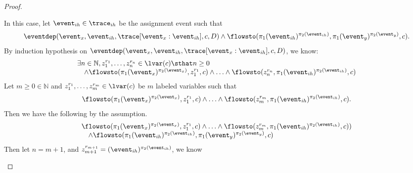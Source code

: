 \begin{proof}
\begin{case}
        In this case, let $\event_{ih}\in \trace_{ih} $ be the assignment event such that
        \[
        \eventdep(\event_x, \event_{ih}, \trace[\event_x:\event_{ih}], c, D)
          \land 
        \flowsto(\pi_1(\event_{ih})^{\pi_2(\event_{ih})}, \pi_1(\event_y)^{\pi_2(\event_y)}, c).
        \]
        By induction hypothesis on $\eventdep(\event_x, \event_{ih}, \trace[\event_x : \event_{ih}], c, D)$, we know:
        \[
          \begin{array}{l}
            \exists n \in \mathbb{N}, z_1^{r_1}, \ldots, z_n^{r_n} \in \lvar(c) 
            \sthat  n \geq 0 
            \\ \quad  \land
            \flowsto(\pi_1(\event_x)^{\pi_2(\event_x)},  z_1^{r_1}, c) 
            \land \ldots \land \flowsto(z_n^{r_n}, \pi_1(\event_{ih})^{\pi_2(\event_{ih})}, c) 
          \end{array}
          \]
          Let $m \geq 0 \in \mathbb{N}$ and $z_1^{r_1}, \ldots, z_m^{r_m} \in \lvar(c) $ be 
          $m$ labeled variables such that
          \[
            \flowsto(\pi_1(\event_x)^{\pi_2(\event_x)},  z_1^{r_1}, c) 
          \land \ldots \land \flowsto(z_m^{r_m}, \pi_1(\event_{ih})^{\pi_2(\event_{ih})}, c).
          \]
          Then we have the following by the assumption.
          \[
            \begin{array}{l}
            \flowsto(\pi_1(\event_x)^{\pi_2(\event_x)},  z_1^{r_1}, c) 
            \land \ldots \land \flowsto(z_m^{r_m}, \pi_1(\event_{ih})^{\pi_2(\event_{ih})}, c) )
             \\ \quad  
             \land  \flowsto(\pi_1(\event_{ih})^{\pi_2(\event_{ih})}, \pi_1(\event_y)^{\pi_2(\event_y)}, c) 
            \end{array}
            \]
            Then let $n = m + 1$,
            and $z_{m+1}^{r_{m+1}} = (\event_{ih})^{\pi_2(\event_{ih})}$, we know

\end{case}
\end{proof}

